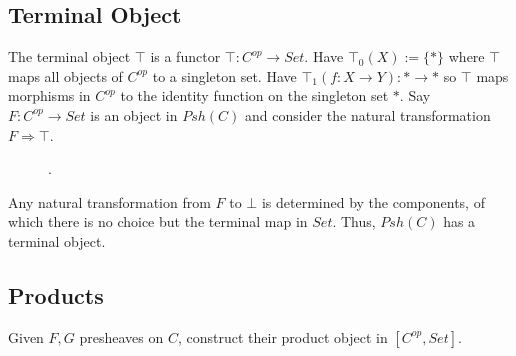 \documentclass{article}
\begin{document}
\subsection{Terminal Object}
The terminal object $\top$ is a functor $\top : C^{op} \rightarrow Set$. Have $\top_{0} (X) := \{*\}$ where $\top$ maps all objects of $C^{op}$ to a singleton set. Have $\top_{1} (f : X \rightarrow Y) : {*} \rightarrow {*}$ so $\top$ maps morphisms in $C^{op}$ to the identity function on the singleton set ${*}$. 
Say $F : C^{op} \rightarrow Set$ is an object in $Psh(C)$ and consider the natural transformation $F \Rightarrow \top$.

\begin{figure}[!h]
\centering
    . 
\end{figure}

        Any natural transformation from $F$ to $\bot$ is determined by the components, of which there is no choice but the terminal map in $Set$. Thus, $Psh(C)$ has a terminal object.

\subsection{Products}
Given $F,G$ presheaves on $C$, construct their product object in $[C^{op},Set]$.
\end{document}
